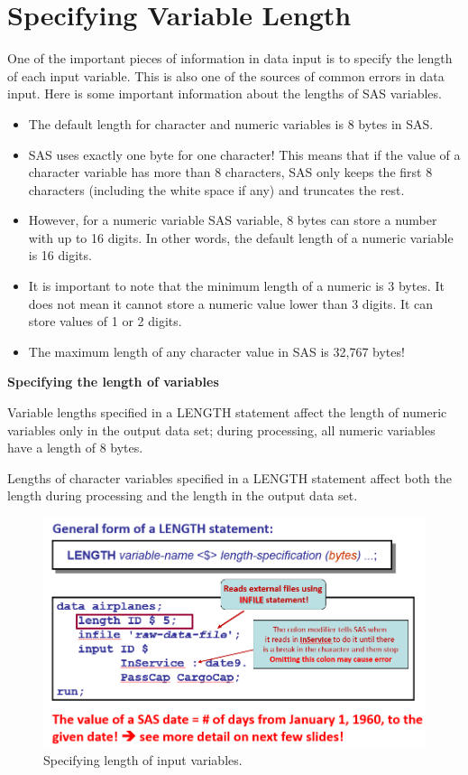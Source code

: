\documentclass[
]{book}
\begin{document}
\hypertarget{specifying-variable-length}{%
\section{Specifying Variable Length}\label{specifying-variable-length}}

One of the important pieces of information in data input is to specify the length of each input variable. This is also one of the sources of common errors in data input. Here is some important information about the lengths of SAS variables.

\begin{itemize}
\item
  The default length for character and numeric variables is 8 bytes in SAS.
\item
  SAS uses exactly one byte for one character! This means that if the value of a character variable has more than 8 characters, SAS only keeps the first 8 characters (including the white space if any) and truncates the rest.
\item
  However, for a numeric variable SAS variable, 8 bytes can store a number with up to 16 digits. In other words, the default length of a numeric variable is 16 digits.
\item
  It is important to note that the minimum length of a numeric is 3 bytes. It does not mean it cannot store a numeric value lower than 3 digits. It can store values of 1 or 2 digits.
\item
  The maximum length of any character value in SAS is 32,767 bytes!
\end{itemize}

\textbf{Specifying the length of variables}

Variable lengths specified in a LENGTH statement affect the length of numeric variables only in the output data set; during processing, all numeric variables have a length of 8 bytes.

Lengths of character variables specified in a LENGTH statement affect both the length during processing and the length in the output data set.

\begin{figure}

{\centering \includegraphics[width=0.6\linewidth]{img03/w03-SpecifyingLengthofVariables} 

}

\caption{Specifying length of input variables.}\label{fig:unnamed-chunk-13}
\end{figure}
\end{document}
